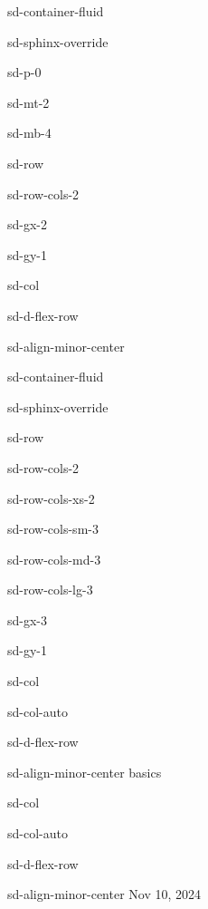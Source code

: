 \documentclass[letterpaper,10pt,english]{jupyterBook}
\begin{document}
\begin{sphinxuseclass}{sd-container-fluid}
\begin{sphinxuseclass}{sd-sphinx-override}
\begin{sphinxuseclass}{sd-p-0}
\begin{sphinxuseclass}{sd-mt-2}
\begin{sphinxuseclass}{sd-mb-4}
\begin{sphinxuseclass}{sd-row}
\begin{sphinxuseclass}{sd-row-cols-2}
\begin{sphinxuseclass}{sd-gx-2}
\begin{sphinxuseclass}{sd-gy-1}
\begin{sphinxuseclass}{sd-col}
\begin{sphinxuseclass}{sd-d-flex-row}
\begin{sphinxuseclass}{sd-align-minor-center}
\begin{sphinxuseclass}{sd-container-fluid}
\begin{sphinxuseclass}{sd-sphinx-override}
\begin{sphinxuseclass}{sd-row}
\begin{sphinxuseclass}{sd-row-cols-2}
\begin{sphinxuseclass}{sd-row-cols-xs-2}
\begin{sphinxuseclass}{sd-row-cols-sm-3}
\begin{sphinxuseclass}{sd-row-cols-md-3}
\begin{sphinxuseclass}{sd-row-cols-lg-3}
\begin{sphinxuseclass}{sd-gx-3}
\begin{sphinxuseclass}{sd-gy-1}
\begin{sphinxuseclass}{sd-col}
\begin{sphinxuseclass}{sd-col-auto}
\begin{sphinxuseclass}{sd-d-flex-row}
\begin{sphinxuseclass}{sd-align-minor-center}
\sphinxAtStartPar
basics

\end{sphinxuseclass}
\end{sphinxuseclass}
\end{sphinxuseclass}
\end{sphinxuseclass}
\begin{sphinxuseclass}{sd-col}
\begin{sphinxuseclass}{sd-col-auto}
\begin{sphinxuseclass}{sd-d-flex-row}
\begin{sphinxuseclass}{sd-align-minor-center}
\sphinxAtStartPar
Nov 10, 2024


\end{sphinxuseclass}
\end{sphinxuseclass}
\end{sphinxuseclass}
\end{sphinxuseclass}
\end{sphinxuseclass}
\end{sphinxuseclass}
\end{sphinxuseclass}
\end{sphinxuseclass}
\end{sphinxuseclass}
\end{sphinxuseclass}
\end{sphinxuseclass}
\end{sphinxuseclass}
\end{sphinxuseclass}
\end{sphinxuseclass}
\end{sphinxuseclass}
\end{sphinxuseclass}
\end{sphinxuseclass}
\end{sphinxuseclass}
\end{sphinxuseclass}
\end{sphinxuseclass}
\end{sphinxuseclass}
\end{sphinxuseclass}
\end{sphinxuseclass}
\end{sphinxuseclass}
\end{sphinxuseclass}
\end{sphinxuseclass}
\end{document}
